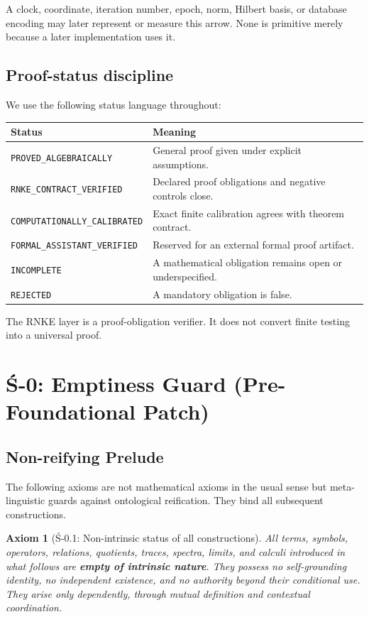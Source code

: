 \documentclass[11pt]{article}
\newtheorem{axiom}[theorem]{Axiom}
\newcommand{\status}[1]{\texttt{#1}}
\begin{document}
A clock, coordinate, iteration number, epoch, norm, Hilbert basis, or database encoding may later represent or measure this arrow. None is primitive merely because a later implementation uses it.

\subsection{Proof-status discipline}

We use the following status language throughout:

\begin{center}
\begin{tabular}{ll}
\toprule
Status & Meaning\\
\midrule
\status{PROVED\_ALGEBRAICALLY} & General proof given under explicit assumptions.\\
\status{RNKE\_CONTRACT\_VERIFIED} & Declared proof obligations and negative controls close.\\
\status{COMPUTATIONALLY\_CALIBRATED} & Exact finite calibration agrees with theorem contract.\\
\status{FORMAL\_ASSISTANT\_VERIFIED} & Reserved for an external formal proof artifact.\\
\status{INCOMPLETE} & A mathematical obligation remains open or underspecified.\\
\status{REJECTED} & A mandatory obligation is false.\\
\bottomrule
\end{tabular}
\end{center}

The RNKE layer is a proof-obligation verifier. It does not convert finite testing into a universal proof.

\section{Ś-0: Emptiness Guard (Pre-Foundational Patch)}

\subsection{Non-reifying Prelude}

The following axioms are not mathematical axioms in the usual sense but meta-linguistic guards against ontological reification. They bind all subsequent constructions.

\begin{axiom}[Ś-0.1: Non-intrinsic status of all constructions]
All terms, symbols, operators, relations, quotients, traces, spectra, limits, and calculi introduced in what follows are \textbf{empty of intrinsic nature}. They possess no self-grounding identity, no independent existence, and no authority beyond their conditional use. They arise only dependently, through mutual definition and contextual coordination.
\end{axiom}
\end{document}
